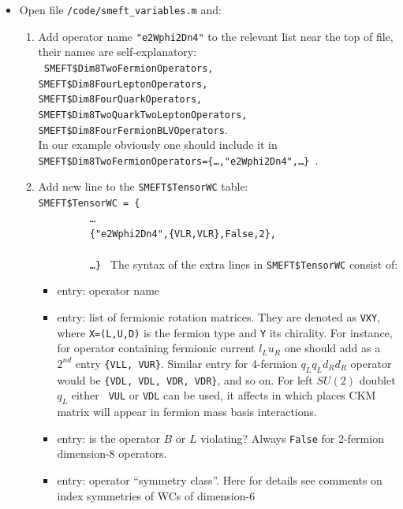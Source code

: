 \documentclass[a4paper,12pt]{article}
\numberwithin{equation}{section}
\begin{document}
\begin{itemize}
\item Open file {\tt/code/smeft\_variables.m} and:
\begin{enumerate}
\item Add operator name {\tt "e2Wphi2Dn4"} to the relevant list near
  the top of file, their names are self-explanatory:\\ {\tt
    SMEFT\$Dim8TwoFermionOperators,\\
    SMEFT\$Dim8FourLeptonOperators,\\
    SMEFT\$Dim8FourQuarkOperators,\\
    SMEFT\$Dim8TwoQuarkTwoLeptonOperators,\\
    SMEFT\$Dim8FourFermionBLVOperators}.\\[2mm]
  In our example obviously one should include it in\\
  {\tt SMEFT\$Dim8TwoFermionOperators=\{\dots,"e2Wphi2Dn4",\dots\} }.
\item Add new line to the {\tt SMEFT\$TensorWC} table:\\[2mm]
%
  {\tt SMEFT\$TensorWC = \{\\
%
  $\phantom{XXXXX}$  \dots\\
%
  $\phantom{XXXXX}$  \{"e2Wphi2Dn4",\{VLR,VLR\},False,2\},\\
    $\phantom{XXXXX}$ \\
%
   $\phantom{XXXXX}$  \dots \}
  }
  \newpage
The syntax of the extra lines in {\tt SMEFT\$TensorWC} consist of:
    \begin{itemize}
    \item[$1^{st}$] entry: operator name
    \item[$2^{nd}$] entry: list of fermionic rotation matrices. They
      are denoted as {\tt VXY}, where {\tt X=(L,U,D)} is the fermion
      type and {\tt Y} its chirality. For instance, for operator
      containing fermionic current $l_L u_R$ one should add as a
      $2^{nd}$ entry {\tt \{VLL, VUR\}}. Similar entry for 4-fermion
      $q_L q_L d_R d_R $ operator would be {\tt \{VDL, VDL, VDR,
        VDR\}}, and so on. For left $SU(2)$ doublet $q_L$ either {\tt
        VUL} or {\tt VDL} can be used, it affects in which places CKM
      matrix will appear in fermion mass basis interactions.
    \item [$3^{rd}$] entry: is the operator $B$ or $L$ violating?
      Always {\tt False} for 2-fermion dimension-8 operators.
    \item [$4^{th}$] entry: operator ``symmetry class''. Here for
      details see comments on index symmetries of WCs of dimension-6

\end{itemize}
\end{enumerate}
\end{itemize}
\end{document}
